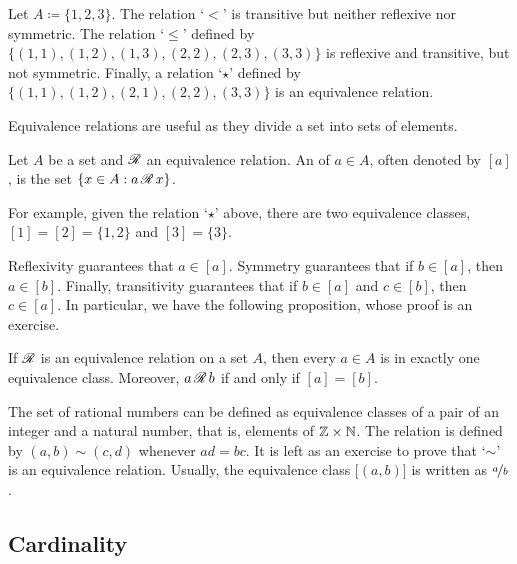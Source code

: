 \begin{example}
Let $A \coloneqq \{ 1,2,3 \}$.
The relation `$<$' is transitive but neither reflexive nor symmetric.  The
relation `$\leq$' defined by
$\bigl\{ (1,1), (1,2), (1,3), (2,2), (2,3), (3,3) \bigr\}$
is reflexive and transitive, but not symmetric.
Finally, a relation `$\star$' defined by
$\bigl\{ (1,1), (1,2), \allowbreak (2,1), \allowbreak (2,2), \allowbreak (3,3) \bigr\}$ is
an equivalence relation.
\end{example}

Equivalence relations are useful as they divide a set into sets of
 elements.

\begin{defn}
Let $A$ be a set and ${\mathscr{R}}$ an equivalence relation.
An \emph{} of $a \in A$, often denoted
by $[a]$, is the set $\{ x \in A : a\, {\mathscr{R}} \, x \}$.
\end{defn}

For example, given the relation `$\star$' above, there are two equivalence classes,
$[1] = [2] = \{ 1,2 \}$ and $[3] = \{ 3 \}$.

Reflexivity guarantees that $a \in [a]$.  Symmetry guarantees
that if $b \in [a]$, then $a \in [b]$.  Finally, transitivity guarantees that
if $b \in [a]$ and $c \in [b]$, then $c \in [a]$.
In particular, we have the following proposition, whose proof is an
exercise.

\begin{prop} \label{prop:equivclasses}
If ${\mathscr{R}}$ is an equivalence relation on a set $A$,
then every $a \in A$ is in exactly one
equivalence class.  Moreover, $a\, {\mathscr{R}} \, b$ if and only if $[a] = [b]$.
\end{prop}

\begin{example} \label{example:ratnums}
The set of rational numbers can be defined as equivalence classes of
a pair of an integer and a natural number,
that is, elements of ${\mathbb{Z}} \times {\mathbb{N}}$.  The relation
is defined by $(a,b) \sim (c,d)$ whenever $ad = bc$.
It is left as an exercise to prove that `$\sim$' is an equivalence relation.
Usually, the equivalence class $\bigl[(a,b)\bigr]$ is written as $\nicefrac{a}{b}$.
\end{example}

\subsection{Cardinality}


